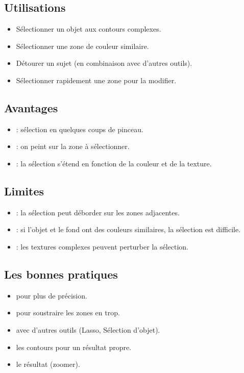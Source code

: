 \subsection{Utilisations}

\begin{itemize}
    \item Sélectionner un objet aux contours complexes.
    \item Sélectionner une zone de couleur similaire.
    \item Détourer un sujet (en combinaison avec d'autres outils).
    \item Sélectionner rapidement une zone pour la modifier.
\end{itemize}

\subsection{Avantages}

\begin{itemize}
    \item {} : sélection en quelques coups de pinceau.
    \item {} : on peint sur la zone à sélectionner.
    \item {} : la sélection s'étend en fonction de la couleur et de la texture.
\end{itemize}

\subsection{Limites}

\begin{itemize}
    \item {} : la sélection peut déborder sur les zones adjacentes.
    \item {} : si l'objet et le fond ont des couleurs similaires, la sélection est difficile.
    \item {} : les textures complexes peuvent perturber la sélection.
\end{itemize}

\subsection{Les bonnes pratiques}

\begin{itemize}
    \item {} pour plus de précision.
    \item {} pour soustraire les zones en trop.
    \item {} avec d'autres outils (Lasso, Sélection d'objet).
    \item {} les contours pour un résultat propre.
    \item {} le résultat (zoomer).
\end{itemize}

